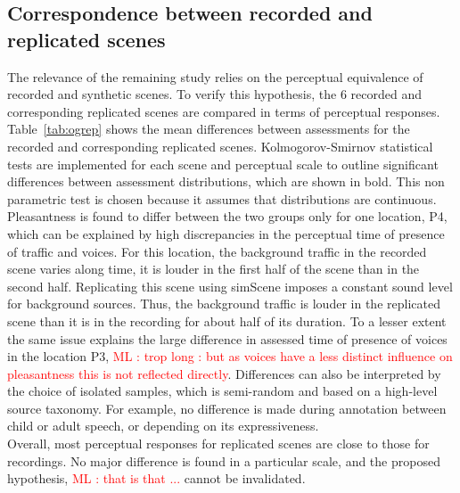 \documentclass[11pt,a4paper]{article}
\newcommand{\ml}[1]{\textcolor{red}{ML : #1}}
\begin{document}
\subsection{Correspondence between recorded and replicated scenes}

The relevance of the remaining study relies on the perceptual equivalence of recorded and synthetic scenes. To verify this hypothesis, the 6 recorded and corresponding replicated scenes are compared in terms of perceptual responses.\\

Table~\ref{tab:ogrep} shows the mean differences between assessments for the recorded and corresponding replicated scenes. Kolmogorov-Smirnov statistical tests are implemented for each scene and perceptual scale to outline significant differences between assessment distributions, which are shown in bold. This non parametric test is chosen because it assumes that distributions are continuous. Pleasantness is found to differ between the two groups only for one location, P4, which can be explained by high discrepancies in the perceptual time of presence of traffic and voices. For this location, the background traffic in the recorded scene varies along time, it is louder in the first half of the scene than in the second half. Replicating this scene using simScene imposes a constant sound level for background sources. Thus, the background traffic is louder in the replicated scene than it is in the recording for about half
of its duration. To a lesser extent the same issue explains the large difference in assessed time of presence of voices in the location P3, \ml{trop long : but as voices have a less distinct influence on pleasantness this is not reflected directly}. Differences can also be interpreted by the choice of isolated samples, which is semi-random and based on a high-level source taxonomy. For example, no difference is made during annotation between child or adult speech, or depending on its expressiveness.\\

Overall, most perceptual responses for replicated scenes are close to those for recordings. No major difference is found in a particular scale, and the proposed hypothesis, \ml{that is that ...} cannot be invalidated.
\end{document}
